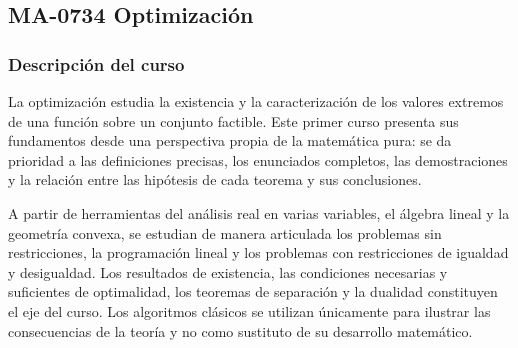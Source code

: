 ﻿%
\newpage
\subsection*{MA-0734 Optimización}
\hypertarget{MA0734}{}
\begin{refsection}
\begin{table}[H]
\end{table}

\subsubsection*{Descripción del curso}

La optimización estudia la existencia y la caracterización de los valores extremos de una función sobre un conjunto factible. Este primer curso presenta sus fundamentos desde una perspectiva propia de la matemática pura: se da prioridad a las definiciones precisas, los enunciados completos, las demostraciones y la relación entre las hipótesis de cada teorema y sus conclusiones.

A partir de herramientas del análisis real en varias variables, el álgebra lineal y la geometría convexa, se estudian de manera articulada los problemas sin restricciones, la programación lineal y los problemas con restricciones de igualdad y desigualdad. Los resultados de existencia, las condiciones necesarias y suficientes de optimalidad, los teoremas de separación y la dualidad constituyen el eje del curso. Los algoritmos clásicos se utilizan únicamente para ilustrar las consecuencias de la teoría y no como sustituto de su desarrollo matemático.


\end{refsection}
